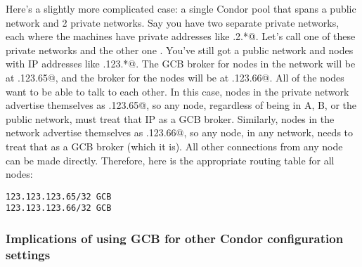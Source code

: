 Here's a slightly more complicated case: a single Condor pool that
spans a public network and 2 private networks.
Say you have two separate private networks, each where the machines
have private addresses like .2.*@.
Let's call one of these private networks \verb@A@ and the other one
\verb@B@. 
You've still got a public network and nodes with IP addresses like
.123.*@.
The GCB broker for nodes in the \verb@A@ network will be at
.123.65@, and the broker for the \verb@B@ nodes will be
at .123.66@.
All of the nodes want to be able to talk to each other.
In this case, nodes in the \verb@A@ private network advertise
themselves as .123.65@, so any node, regardless of being
in A, B, or the public network, must treat that IP as a GCB broker.
Similarly, nodes in the \verb@B@ network advertise themselves as
.123.66@, so any node, in any network, needs to treat
that as a GCB broker (which it is).
All other connections from any node can be made directly.
Therefore, here is the appropriate routing table for all nodes:

\begin{verbatim}
123.123.123.65/32 GCB
123.123.123.66/32 GCB
\end{verbatim}


\subsubsection{\label{sec:GCB-config-implications}Implications of
using GCB for other Condor configuration settings} 

\Todo



